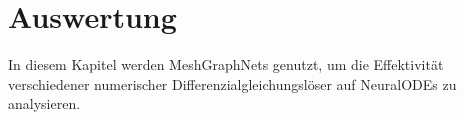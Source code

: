 
\chapter{Auswertung}

In diesem Kapitel werden MeshGraphNets genutzt, um die Effektivität verschiedener numerischer
Differenzialgleichungslöser auf NeuralODEs zu analysieren.

% 






